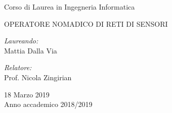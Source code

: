 \documentclass[a4paper,11pt]{article}
\begin{document}
\centering\large

\vspace*{1cm}

Corso di Laurea in Ingegneria Informatica

\vspace{6cm}

\uppercase{{\Large Operatore nomadico di reti di sensori}}

\vspace{6cm}

\begin{minipage}{0.5\textwidth}
\raggedright
\emph{Laureando:}\\
Mattia Dalla Via
\end{minipage}%
\begin{minipage}{0.5\textwidth}
\raggedleft
\emph{Relatore:}\\
Prof. Nicola Zingirian
\end{minipage}

\vspace{4cm}

18 Marzo 2019\\
\smallskip
Anno accademico 2018/2019

\thispagestyle{empty}
\end{document}
